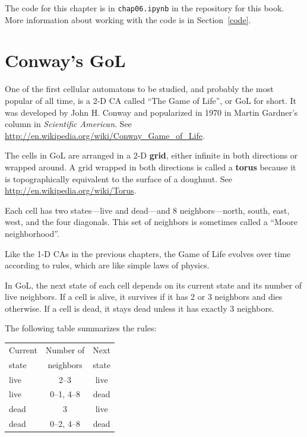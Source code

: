 \documentclass[12pt]{book}
\theoremstyle{exercise}
\begin{document}
The code for this chapter is in {\tt chap06.ipynb} in the repository
for this book.  More information about working with the code is
in Section~\ref{code}.


\section{Conway's GoL}

\label{life}

One of the first cellular automatons to be studied, and probably the
most popular of all time, is a 2-D CA called ``The Game of Life'', or GoL
for short.  It was developed by John H. Conway and popularized in 1970
in Martin Gardner's column in {\em Scientific American}.
See \url{http://en.wikipedia.org/wiki/Conway_Game_of_Life}.

The cells in GoL are arranged in a 2-D {\bf grid}, either infinite in
both directions or wrapped around.  A grid wrapped in both directions
is called a {\bf torus} because it is topographically equivalent to
the surface of a doughnut.  See
\url{http://en.wikipedia.org/wiki/Torus}.


Each cell has two states---live and dead---and 8 neighbors---north,
south, east, west, and the four diagonals.  This set of neighbors
is sometimes called a ``Moore neighborhood''.


Like the 1-D CAs in the previous chapters, the Game of Life evolves
over time according to rules, which are like simple laws of physics.

In GoL, the next state of each cell depends on its current state and
its number of live neighbors.  If a cell is alive, it survives if it
has 2 or 3 neighbors and dies otherwise.  If a cell is
dead, it stays dead unless it has exactly 3 neighbors.

The following table summarizes the rules:

\begin{tabular}{|l|c|c|}
\hline
Current    &    Number of     & Next \\
state      &    neighbors     & state \\
\hline
live       &  2--3          & live         \\
live       &  0--1, 4--8    & dead         \\
dead       &  3             & live         \\
dead       &  0--2, 4--8    & dead         \\
\hline
\end{tabular}
\end{document}
